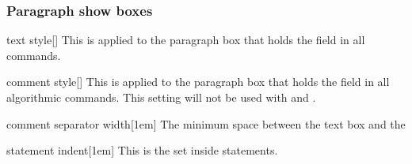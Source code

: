 \documentclass[a4paper, 11pt]{article}
\begin{document}
\subsubsection{Paragraph show boxes}

\begin{option}{text style}{}[]
    This  is applied to the paragraph box that holds the  field in all commands.
\end{option}

\begin{option}{comment style}{}[]
    This  is applied to the paragraph box that holds the  field in all algorithmic commands. This setting will not be used with  and .
\end{option}

\begin{option}{comment separator width}{}[1em]
    The minimum space between the text box and the 
\end{option}

\begin{option}{statement indent}{}[1em]
    This is the  set inside  statements.
\end{option}

\begin{comment}
    parameter indent = 0pt,
\end{comment}


%
\end{document}
